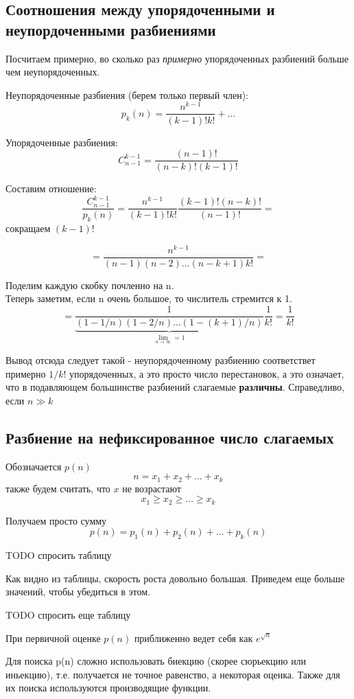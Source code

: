 \subsection{Соотношения между упорядоченными и неупордоченными разбиениями}

Посчитаем примерно, во сколько раз \textit{примерно} упорядоченных разбиений больше чем неупорядоченных.

Неупорядоченные разбиения (берем только первый член):
$$
p_k(n) = \frac{n^{k-1}}{(k-1)!k!} + \ldots
$$

Упорядоченные разбиения:
$$
C_{n-1}^{k-1} = \frac{(n-1)!}{(n-k)!(k-1)!}
$$

Составим отношение:
$$
\frac{C_{n-1}^{k-1}}{p_k(n)} = \frac{n^{k-1}}{(k-1)!k!} \frac{(k-1)!(n-k)!}{(n-1)!} =
$$
сокращаем $(k-1)!$

$$
= \frac{n^{k-1}}{(n-1)(n-2) \ldots (n-k+1) k!} = 
$$

Поделим каждую скобку почленно на n. \\
Теперь заметим, если n очень большое, то числитель стремится к 1.
$$
= \underbrace{\frac{1}{(1-1/n)(1-2/n) \ldots (1-(k+1)/n)}}_{ \lim_{n \to \infty} =1 }  \frac{1}{k!} = \frac{1}{k!}
$$

Вывод отсюда следует такой - неупорядоченному разбиению соответствет примерно $1/k!$ упорядоченных, а это просто число перестановок, а это означает, что в подавляющем большинстве разбиений слагаемые \textbf{различны}. 
Справедливо, если $n \gg k$

\subsection{Разбиение на нефиксированное число слагаемых}

Обозначается $p(n)$
$$
n = x_1 + x_2 + \ldots + x_k
$$
также будем считать, что $x$ не возрастают
$$
x_1 \ge x_2 \ge \ldots \ge x_k
$$

Получаем просто сумму 
$$
p(n) = p_1(n) + p_2(n) + \ldots + p_k(n)
$$

TODO спросить таблицу

Как видно из таблицы, скорость роста довольно большая.
Приведем еще больше значений, чтобы убедиться в этом.

TODO спросить еще таблицу

При первичной оценке $p(n)$ приближенно ведет себя как $e^{ \sqrt{n} }$

Для поиска p(n) сложно использовать биекцию (скорее сюрьекцию или иньекцию), т.е. получается не точное равенство, а некоторая оценка.
Также для их поиска используются производящие функции.

